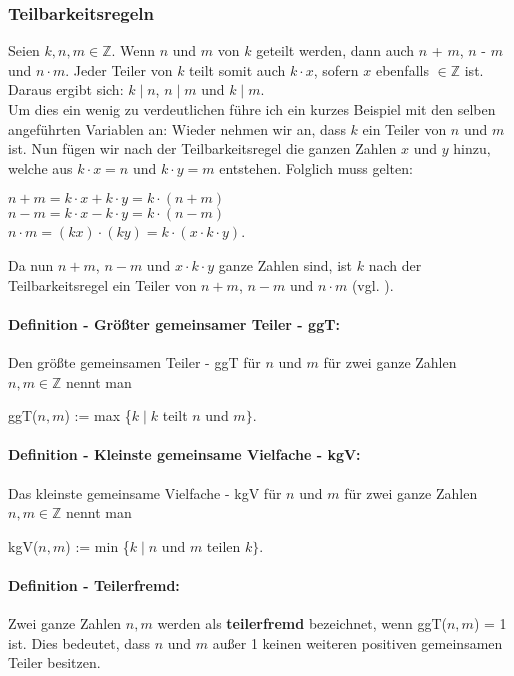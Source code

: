 \documentclass[german,12pt,a4paper]{article}
\begin{document}
\subsubsection{Teilbarkeitsregeln}
Seien $k, n, m \in \mathbb{Z}$. Wenn $n$ und $m$ von $k$ geteilt werden, dann auch $n$ + $m$,\newline
$n$ - $m$ und $n\cdot m$. Jeder Teiler von $k$ teilt somit auch $k \cdot x$, sofern $x$ ebenfalls $\in \mathbb{Z}$ ist. Daraus ergibt sich: $k \mid n$, $n \mid m$ und $k \mid m$.\\
Um dies ein wenig zu verdeutlichen führe ich ein kurzes Beispiel mit den selben angeführten Variablen an: Wieder nehmen wir an, dass $k$ ein Teiler von $n$ und $m$ ist. Nun fügen wir nach der Teilbarkeitsregel die ganzen Zahlen $x$ und $y$ hinzu, welche aus $k \cdot x = n$ und $k \cdot y = m$ entstehen. Folglich muss gelten:
\begin{center}
$n + m = k \cdot x + k \cdot y = k \cdot (n + m)$\\
$n - m = k \cdot x - k \cdot y = k \cdot (n - m)$\\
$n \cdot m = (kx) \cdot (ky) = k \cdot (x \cdot k \cdot y)$.
\end{center}
Da nun $n + m$, $n - m$ und $x \cdot k \cdot y$ ganze Zahlen sind, ist $k$ nach der Teilbarkeitsregel ein Teiler von $n + m$, $n - m$ und $n \cdot m$ (vgl. \cite[13--15]{RempeGillen2009}).
\paragraph{Definition - Größter gemeinsamer Teiler - ggT:}
Den größte gemeinsamen Teiler - ggT für $n$ und $m$ für zwei ganze Zahlen $n, m\in \mathbb{Z}$ nennt man
\begin{center}
ggT($n, m$) := max \{$k \mid k$ teilt $n$ und $m\}$.
\end{center}
\paragraph{Definition - Kleinste gemeinsame Vielfache - kgV:}
Das kleinste gemeinsame Vielfache - kgV für $n$ und $m$ für zwei ganze Zahlen $n, m\in \mathbb{Z}$ nennt man
\begin{center}
kgV($n, m$) := min \{$k \mid n$ und $m$ teilen $k\}$.
\end{center}
\paragraph{Definition - Teilerfremd:}
Zwei ganze Zahlen $n, m$ werden als \textbf{teilerfremd} bezeichnet, wenn ggT($n, m$) = 1 ist. Dies bedeutet, dass $n$ und $m$ außer 1 keinen weiteren positiven gemeinsamen Teiler besitzen.
\newpage
\end{document}
